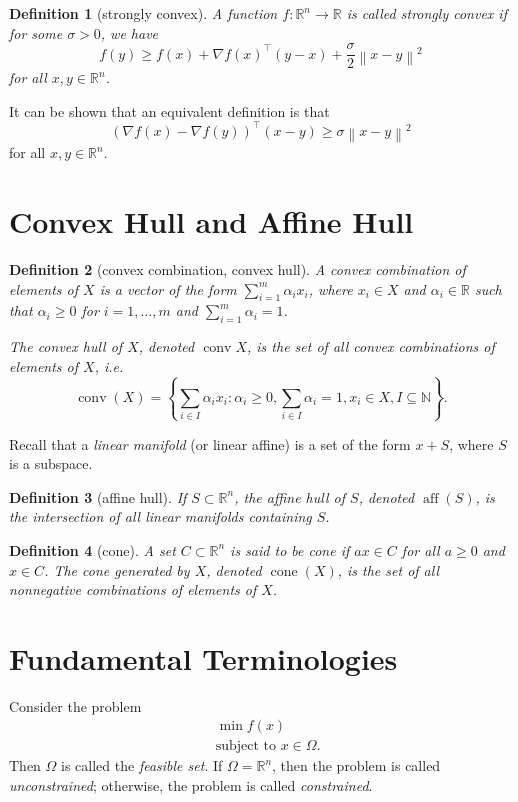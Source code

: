 \documentclass[12pt,a4paper]{report}
\numberwithin{equation}{section}
\theoremstyle{mystyle}
\newtheorem{definition}{Definition}[section]
\newcommand{\R}{\mathbb{R}}
\newcommand{\N}{\mathbb{N}}
\newcommand{\grad}{\nabla}
\newcommand{\T}{\top}
\newcommand{\conv}{\operatorname{conv}}
\newcommand{\cone}{\operatorname{cone}}
\newcommand{\aff}{\operatorname{aff}}
\newcommand{\norm}[1]{\left\lVert #1 \right\rVert}
\begin{document}
	
	\begin{definition}[strongly convex]
		A function $f:\R^n \to \R$ is called \emph{strongly convex} if for some $\sigma>0$, we have
		\begin{equation}
			f(y)\geq f(x)+\grad f(x)^\T (y-x)+\frac{\sigma}{2}\norm{x-y}^2
		\end{equation}
		for all $x,y\in \R^n$.
	\end{definition}
	It can be shown that an equivalent definition is that
	\begin{equation}
		(\grad f(x)-\grad f(y))^\T(x-y)\geq \sigma \norm{x-y}^2
	\end{equation}
	for all $x,y\in \R^n$.
	
	
	\section{Convex Hull and Affine Hull}
	\begin{definition}[convex combination, convex hull]
		A \emph{convex combination} of elements of $X$ is a vector of the form $\sum_{i=1}^m \alpha_i x_i$, where $x_i\in X$ and $\alpha_i\in \R$ such that $\alpha_i\geq 0$ for $i=1,\dots,m$ and $\sum_{i=1}^m \alpha_i =1$.
		
		The \emph{convex hull} of $X$, denoted $\conv{X}$, is the set of all convex combinations of elements of $X$, i.e.
		\begin{equation}
			\conv(X) = \left\{\sum_{i\in I} \alpha_i x_i: \alpha_i\geq 0, \sum_{i\in I}\alpha_i=1, x_i\in X, I\subseteq \N \right\}.
		\end{equation} 
	\end{definition}
	
	Recall that a \emph{linear manifold} (or linear affine) is a set of the form $x+S$, where $S$ is a subspace.
	\begin{definition}[affine hull]
		If $S\subset \R^n$, the \emph{affine hull} of $S$, denoted $\aff(S)$, is the intersection of all linear manifolds containing $S$. 
	\end{definition}
	
	\begin{definition}[cone]
		A set $C\subset \R^n$ is said to be \emph{cone} if $ax\in C$ for all $a\geq 0$ and $x\in C$. The \emph{cone generated by $X$}, denoted $\cone(X)$, is the set of all nonnegative combinations of elements of $X$.
	\end{definition}
	
	
	\section{Fundamental Terminologies}
	Consider the problem
	\begin{equation}
		\begin{split}
			&\ \min f(x)\\
			&\ \text{subject to } x\in \Omega.  
		\end{split}
	\end{equation}
	Then $\Omega$ is called the \emph{feasible set}. If $\Omega=\R^n$, then the problem is called \emph{unconstrained}; otherwise, the problem is called \emph{constrained}.
	
\end{document}
